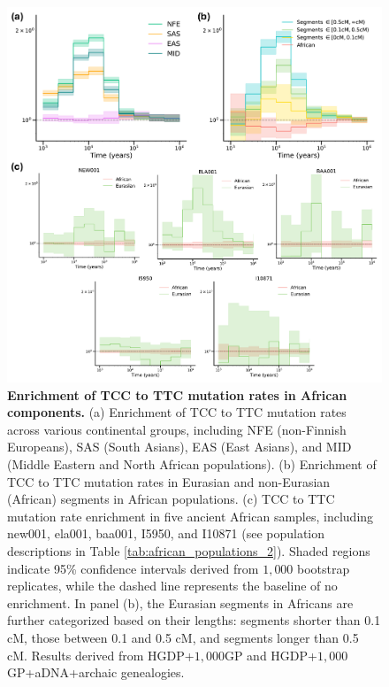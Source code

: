 \begin{figure}
    \centering
    \includegraphics[width=\linewidth]{figures/gb_bta/gb_real_bta_8.pdf}
    \captionsetup{width=\textwidth+3cm}
    \caption{
    \footnotesize
    \textbf{Enrichment of TCC to TTC mutation rates in African components.} (a) Enrichment of TCC to TTC mutation rates across various continental groups, including NFE (non-Finnish Europeans), SAS (South Asians), EAS (East Asians), and MID (Middle Eastern and North African populations). (b) Enrichment of TCC to TTC mutation rates in Eurasian and non-Eurasian (African) segments in African populations. (c) TCC to TTC mutation rate enrichment in five ancient African samples, including new001, ela001, baa001, I5950, and I10871 (see population descriptions in Table \ref{tab:african_populations_2}). Shaded regions indicate 95\% confidence intervals derived from $1{,}000$ bootstrap replicates, while the dashed line represents the baseline of no enrichment. In panel (b), the Eurasian segments in Africans are further categorized based on their lengths: segments shorter than 0.1 cM, those between 0.1 and 0.5 cM, and segments longer than 0.5 cM. Results derived from HGDP+$1{,}000$GP and HGDP+$1{,}000$GP+aDNA+archaic genealogies.
    }
    \label{fig:gb-mut-tcc}
\end{figure}


